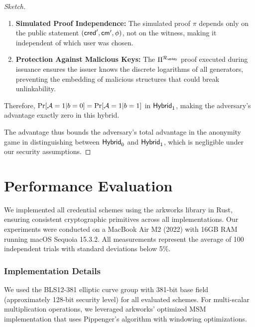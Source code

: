 \begin{proof}[Sketch]
\begin{enumerate}
    \item \textbf{Simulated Proof Independence:} The simulated proof $\pi$ depends only on the public statement $(\mathsf{cred}', \mathsf{cm}', \phi)$, not on the witness, making it independent of which user was chosen.
    
    \item \textbf{Protection Against Malicious Keys:} The $\Pi^{\mathcal{R}_{\mathsf{verkey}}}$ proof executed during issuance ensures the issuer knows the discrete logarithms of all generators, preventing the embedding of malicious structures that could break unlinkability.
\end{enumerate}

Therefore, $\Pr[\mathcal{A} = 1 | b = 0] = \Pr[\mathcal{A} = 1 | b = 1]$ in $\mathsf{Hybrid}_1$, making the adversary's advantage exactly zero in this hybrid.

The advantage thus bounds the adversary's total advantage in the anonymity game in distinguishing between $\mathsf{Hybrid}_0$ and $\mathsf{Hybrid}_1$, which is negligible under our security assumptions.
\end{proof}






































\section{Performance Evaluation}\label{sec:performance_evaluation}


We implemented all credential schemes using the arkworks library \cite{arkworks_contributors_arkworks_2022} in Rust, ensuring consistent cryptographic primitives across all implementations. Our experiments were conducted on a MacBook Air M2 (2022) with 16GB RAM running macOS Sequoia 15.3.2. All measurements represent the average of 100 independent trials with standard deviations below 5\%.

\subsubsection{Implementation Details}
We used the BLS12-381 elliptic curve group with 381-bit base field (approximately 128-bit security level) for all evaluated schemes. For multi-scalar multiplication operations, we leveraged arkworks' optimized MSM implementation that uses Pippenger's algorithm with windowing optimizations.

